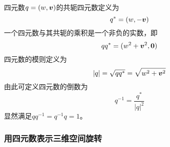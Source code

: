 四元数$q=(w,\boldsymbol{v})$的共轭四元数定义为
\begin{equation}
	q^* = (w,-\boldsymbol{v})
\end{equation}
一个四元数与其共轭的乘积是一个非负的实数，即
\begin{equation}
	qq^* = (w^2+\boldsymbol{v}^2,\boldsymbol{0})
\end{equation}
四元数的模则定义为
\begin{equation}
	|q| = \sqrt{qq^*} = \sqrt{w^2+\boldsymbol{v}^2}
\end{equation}
由此可定义四元数的倒数为
\begin{equation}
	q^{-1} = \frac{q^*}{|q|^2}
\end{equation}
显然满足$qq^{-1}=q^{-1}q=1$。

\subsubsection{用四元数表示三维空间旋转}

